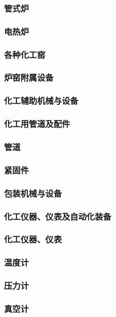 \documentclass[UTF8]{../../ApplicationUniverse}
\begin{document}
    \subsubsection{管式炉}
    \subsubsection{电热炉}
    \subsubsection{各种化工窑}
    \subsubsection{炉窑附属设备}
\subsubsection{化工辅助机械与设备}
    \subsubsection{化工用管道及配件}
        \subsubsection{管道}
        \subsubsection{紧固件}
    \subsubsection{包装机械与设备}
\subsubsection{化工仪器、仪表及自动化装备}
    \subsubsection{化工仪器、仪表}
        \subsubsection{温度计}
        \subsubsection{压力计}
        \subsubsection{真空计}
\end{document}
